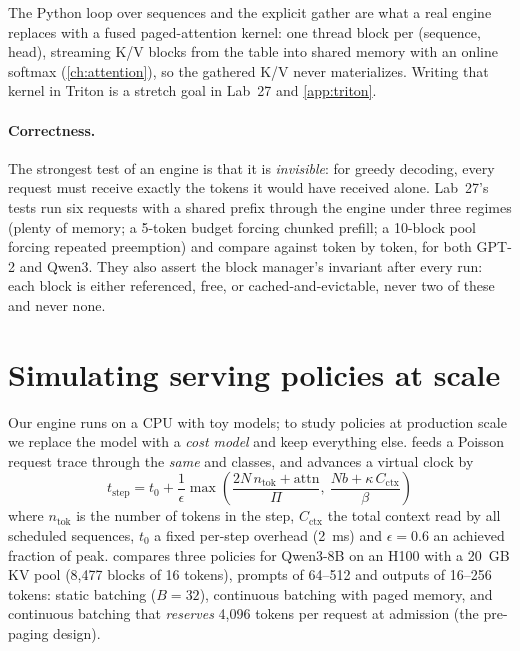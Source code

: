 The Python loop over sequences and the explicit gather are what a real engine replaces with a fused
paged-attention kernel: one thread block per (sequence, head), streaming K/V blocks from the table into
shared memory with an online softmax (\cref{ch:attention}), so the gathered K/V never materializes.
Writing that kernel in Triton is a stretch goal in Lab~27 and \cref{app:triton}.

\paragraph{Correctness.} The strongest test of an engine is that it is \emph{invisible}: for greedy
decoding, every request must receive exactly the tokens it would have received alone. Lab~27's tests
run six requests with a shared prefix through the engine under three regimes (plenty of memory; a
5-token budget forcing chunked prefill; a 10-block pool forcing repeated preemption) and compare against
 token by token, for both GPT-2 and Qwen3. They also assert the block
manager's invariant after every run: each block is either referenced, free, or cached-and-evictable,
never two of these and never none.

\section{Simulating serving policies at scale}\label{sec:serving:sim}

Our engine runs on a CPU with toy models; to study policies at production scale we replace the model
with a \emph{cost model} and keep everything else.  feeds a Poisson
request trace through the \emph{same}  and  classes, and advances a
virtual clock by
\begin{equation}
  t_{\text{step}} = t_0 + \frac{1}{\epsilon}\max\!\left(\frac{2N\,n_{\text{tok}} + \text{attn}}{\Pi},\ \frac{Nb + \kappa\,C_{\text{ctx}}}{\beta}\right)
\end{equation}
where $n_{\text{tok}}$ is the number of tokens in the step, $C_{\text{ctx}}$ the total context read by all
scheduled sequences, $t_0$ a fixed per-step overhead (\SI{2}{ms}) and $\epsilon=0.6$ an achieved
fraction of peak.  compares three policies for Qwen3-8B on an H100 with a
\SI{20}{GB} KV pool (8,477 blocks of 16 tokens), prompts of 64--512 and outputs of 16--256 tokens:
static batching ($B=32$), continuous batching with paged memory, and continuous batching that
\emph{reserves} 4,096 tokens per request at admission (the pre-paging design).

